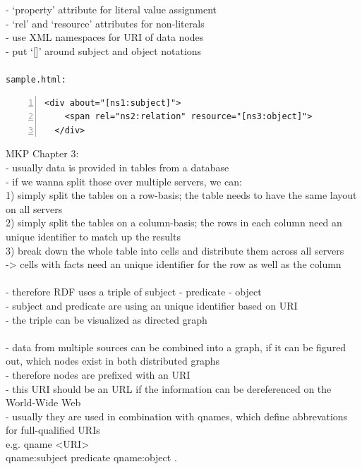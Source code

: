 - `property' attribute for literal value assignment \\
- `rel' and `resource' attributes for non-literals \\
- use XML namespaces for URI of data nodes \\
- put `[]' around subject and object notations \\
\\
\texttt{sample.html:}
\begin{lstlisting}[basicstyle=\ttfamily,numbers=left,numberstyle=\footnotesize\ttfamily,backgroundcolor=\color{sourcegray}]
  <div about="[ns1:subject]">
    <span rel="ns2:relation" resource="[ns3:object]">
  </div>
\end{lstlisting}

MKP Chapter 3: \\
- usually data is provided in tables from a database \\
- if we wanna split those over multiple servers, we can: \\
  1) simply split the tables on a row-basis; the table needs to have the same layout on all servers \\
	2) simply split the tables on a column-basis; the rows in each column need an unique identifier to match up the results \\
	3) break down the whole table into cells and distribute them across all servers \\
	 -> cells with facts need an unique identifier for the row as well as the column \\
\\
- therefore RDF uses a triple of subject - predicate - object \\
- subject and predicate are using an unique identifier based on URI \\
- the triple can be visualized as directed graph \\
\\
- data from multiple sources can be combined into a graph, if it can be figured out, which nodes exist in both distributed graphs \\
- therefore nodes are prefixed with an URI \\
- this URI should be an URL if the information can be dereferenced on the World-Wide Web \\
- usually they are used in combination with qnames, which define abbrevations for full-qualified URIs \\
   e.g. qname <URI> \\
	      qname:subject predicate qname:object . \\
